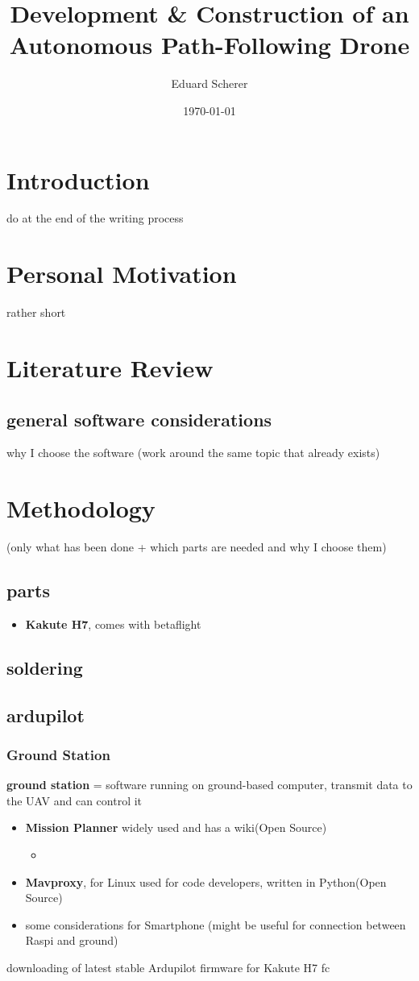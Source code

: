 \documentclass{article}
\author{Eduard Scherer}
\title{Development \& Construction of an Autonomous Path-Following Drone}
\date{\today}
\begin{document}
\maketitle
	\section{Introduction}
	do at the end of the writing process
	\section{Personal Motivation}
	rather short
	\section{Literature Review}
	\subsection{general software considerations}
	why I choose the software
	(work around the same topic that already exists)
	\section{Methodology}
	(only what has been done + which parts are needed and why I choose them)
	\subsection{parts}
	\begin{itemize}
		\item \textbf{Kakute H7}, comes with betaflight
	\end{itemize}
	\subsection{soldering}
	
	\subsection{ardupilot}
	\subsubsection{Ground Station}
	\textbf{ground station} = software running on ground-based computer, transmit data to the UAV and can control it
	\begin{itemize}
		\item \textbf{Mission Planner} widely used and has a wiki(Open Source)
		\begin{itemize}
			\item 
		\end{itemize}
		\item \textbf{Mavproxy}, for Linux used for code developers, written in Python(Open Source)
		\item some considerations for Smartphone (might be useful for connection between Raspi and ground)
	\end{itemize}
	downloading of latest stable Ardupilot firmware for Kakute H7 fc	
	
\end{document}
